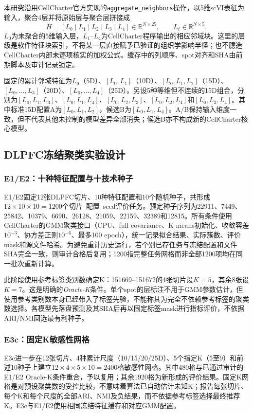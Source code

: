 本研究沿用CellCharter官方实现的\texttt{aggregate\_neighbors}操作，以5维scVI表征为输入，聚合4层并将原始层与聚合层拼接成
\begin{equation}
H=[L_0\mid L_1\mid L_2\mid L_3\mid L_4]
\in\mathbb{R}^{N\times25},\qquad
L_\ell\in\mathbb{R}^{N\times5}.
\label{eq:cc-H-v1}
\end{equation}
$L_0$为未聚合的5维输入层，$L_1$--$L_4$为CellCharter程序输出的相应邻域块。这里的层级是软件特征块索引，不将某一层直接赋予已验证的组织学影响半径；也不臆造CellCharter内部未逐项核实的加权公式。缓存中的列顺序、spot对齐和SHA由前期脚本及审计记录锁定。

固定的累计邻域特征为$L_0$（5D）、$[L_0,L_1]$（10D）、$[L_0,L_1,L_2]$（15D）、$[L_0,\ldots,L_3]$（20D）、$[L_0,\ldots,L_4]$（25D）。另设5种等维但不连续的15D组合，分别为$[L_0,L_1,L_3]$、$[L_0,L_1,L_4]$、$[L_0,L_2,L_3]$、$[L_0,L_2,L_4]$和$[L_0,L_3,L_4]$。其中标准15D配置A为$[L_0,L_1,L_2]$，候选B为$[L_0,L_1,L_4]$。A/B保持输入维度一致，但不代表其他未控制的模型差异全部消失；候选B亦不构成新的CellCharter核心模型。

\subsection{DLPFC冻结聚类实验设计}
\label{subsec:cc-dlpfc-protocol-v1}

\subsubsection{E1/E2：十种特征配置与十技术种子}
E1/E2固定12张DLPFC切片、10种特征配置和10个随机种子，共形成$12\times10\times10=1200$个切片--配置--seed评价任务。预定种子序列为22911、7449、25842、10379、6690、26128、21059、22159、32389和12815。所有条件使用CellCharter的GMM聚类接口（CPU、full covariance、K-means初始化、收敛容差$10^{-3}$、协方差正则$10^{-6}$、最多100 epoch），统一记录拟合结果、实际簇数、评价mask和源文件哈希。为避免重计历史运行，若个别已存任务与冻结配置和文件SHA完全一致，则审计合格后复用；1200指完整任务网格而非全部1200项均在同一批次重新计算。

此阶段使用参考标签类别数确定K：151669--151672的4张切片设$K=5$，其余8张设$K=7$。这是明确的\textit{Oracle-K}条件。单个spot的层标注不用于GMM参数估计，但使用参考类别数本身已经带入了标签先验，不能称其为完全不依赖参考标签的聚类数选择。各模型先落盘预测及其SHA后再以固定标签mask进行指标评价，不依据ARI/NMI回选最有利种子。

\subsubsection{E3c：固定K敏感性网格}
E3c进一步在12张切片、4种累计尺度（10/15/20/25D）、5个指定K（5至9）和前述10种子上建立$12\times4\times5\times10=2400$格敏感性网格。其中480格与已通过审计的E1/E2 Oracle-K条件重合，予以复用；其余1920格为新形成的评价结果。固定K网格是对预设聚类数的受控比较，不意味着算法已自动估计未知K；报告每张切片、每个K和每个尺度的全部ARI、NMI及负结果，而不依据参考标签选择最终推荐K。E3c与E1/E2使用相同冻结特征缓存和对应GMM配置。

